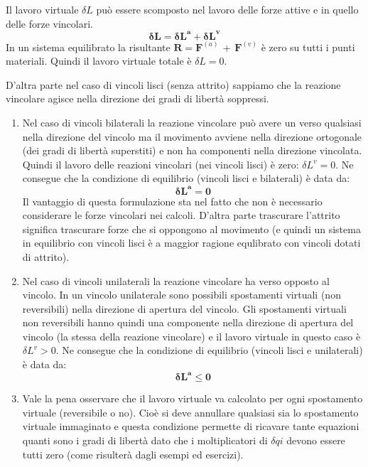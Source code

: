 	Il lavoro virtuale $\delta L$ può essere scomposto nel lavoro delle forze attive e in quello delle forze vincolari.
	\[\mathbf{\delta L = \delta L^a + \delta L^v}\]
	In un sistema equilibrato la risultante $\mathbf{R} = \mathbf{F}^{(a)}\,+\,\mathbf{F}^{(v)}$ è zero su tutti i punti materiali. Quindi il lavoro virtuale totale è $\delta L = 0$. 
	
	D'altra parte nel caso di vincoli lisci (senza attrito) sappiamo che la reazione vincolare agisce nella direzione dei gradi di libertà soppressi. 
	
	\begin{enumerate}
		\item Nel caso di vincoli bilaterali la reazione vincolare può avere un verso qualsiasi nella direzione del vincolo ma il movimento avviene nella direzione ortogonale (dei gradi di libertà superstiti) e non ha componenti nella direzione vincolata. Quindi il lavoro delle reazioni vincolari (nei vincoli lisci) è zero: $\delta L^v = 0$. Ne consegue che la condizione di equilibrio (vincoli lisci e bilaterali) è data da:
		\[\mathbf{\delta L^a = 0}\]
		Il vantaggio di questa formulazione sta nel fatto che non è necessario considerare le forze vincolari nei calcoli. D'altra parte trascurare l'attrito significa trascurare forze che si oppongono al movimento (e quindi un sistema in equilibrio con vincoli lisci  è a maggior ragione equlibrato con vincoli dotati di attrito).
		
		\item Nel caso di vincoli unilaterali la reazione vincolare ha verso opposto al vincolo. In un vincolo unilaterale sono possibili spostamenti virtuali (non reversibili) nella direzione di apertura del vincolo. Gli spostamenti virtuali non reversibili hanno quindi una componente nella direzione di apertura del vincolo (la stessa della reazione vincolare) e il lavoro virtuale in questo caso è $\delta L^v>0$. Ne consegue che la condizione di equilibrio (vincoli lisci e unilaterali) è data da:
		\[\mathbf{\delta L^a \le 0}\]
		
		\item  Vale la pena osservare che il lavoro virtuale va calcolato per ogni spostamento virtuale (reversibile o no). Cioè si deve annullare qualsiasi sia lo spostamento virtuale immaginato e questa condizione permette di ricavare tante equazioni quanti sono i gradi di libertà dato che i moltiplicatori di $\delta qi$ devono essere tutti zero (come risulterà dagli esempi ed esercizi).
	\end{enumerate}

